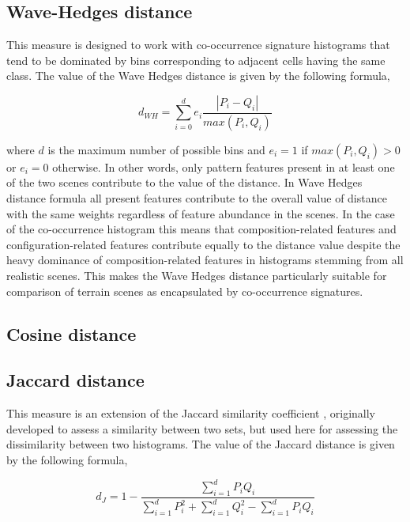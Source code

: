 \subsection{Wave-Hedges distance}

This measure is designed to work with co-occurrence signature histograms that tend to be dominated by bins corresponding to adjacent cells having the same class. 
The value of the Wave Hedges distance is given by the following formula, %

\begingroup
\begin{equation} \label{eq:wave_hedges}
d_{WH}=\sum\limits_{i=0}^{d}{
 e_i\dfrac{ |P_{i} - Q_{i}|}{max(P_{i},Q_{i})}}
\end{equation}
\endgroup

\noindent where $d$ is the maximum number of possible bins and $e_i = 1$ if $max(P_{i},Q_{i})>0$ or $e_i = 0$ otherwise.
In other words, only pattern features present in at least one of the two scenes contribute to the value of the distance. 
In Wave Hedges distance formula all present features contribute to the overall value of distance with the same weights regardless of feature abundance in the scenes. 
In the case of the co-occurrence histogram this means that composition-related features and configuration-related features contribute equally to the distance value despite the heavy dominance of composition-related features in histograms stemming from all realistic scenes. 
This makes the Wave Hedges distance particularly suitable for comparison of terrain scenes as encapsulated by co-occurrence signatures. %

\subsection{Cosine distance}

\subsection{Jaccard distance}

This measure is an extension of the Jaccard similarity coefficient 
, originally developed to assess a similarity between two sets, but used here for assessing the dissimilarity between two histograms. 
The value of the Jaccard distance is given by the following formula, %

\begin{equation} \label{eq:Jaccard}
d_J= 1-\dfrac
{\sum\limits_{i=1}^{d} P_i Q_i}
{\sum\limits_{i=1}^{d} P_i^2 + \sum\limits_{i=1}^{d} Q_i^2 - \sum\limits_{i=1}^{d} P_i Q_i}
\end{equation}

